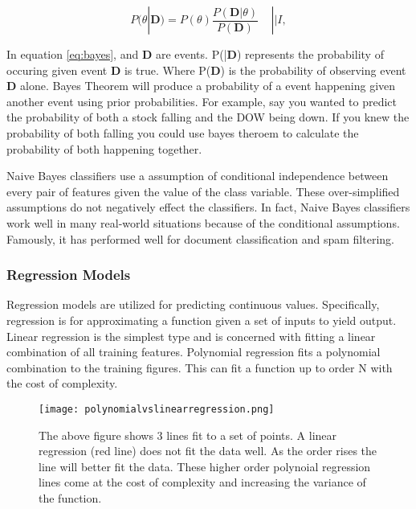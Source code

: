 \begin{equation}
    \label{eq:bayes}
    P(\theta|\textbf{D}) = P(\theta ) \frac{P(\textbf{D} |\theta)}{P(\textbf{D})} ~~~~~|| I,
\end{equation}

In equation \ref{eq:bayes}, \theta and \textbf{D} are events. 
P(\theta|\textbf{D}) represents the probability of \theta occuring given event \textbf{D} is true.
Where P(\textbf{D}) is the probability of observing event \textbf{D} alone.
Bayes Theorem will produce a probability of a event happening given another event using prior probabilities.
For example, say you wanted to predict the probability of both a stock falling and the DOW being down.
If you knew the probability of both falling you could use bayes theroem to calculate the probability of both happening together.

Naive Bayes classifiers use a assumption of conditional independence between every pair of features given the value of the class variable. 
These over-simplified assumptions do not negatively effect the classifiers.
In fact, Naive Bayes classifiers work well in many real-world situations because of the conditional assumptions\cite{zhang2004optimality}.
Famously, it has performed well for document classification and spam filtering. 

\subsubsection{Regression Models}
Regression models are utilized for predicting continuous values.
Specifically, regression is for approximating a function given a set of inputs to yield output.
Linear regression is the simplest type and is concerned with fitting a linear combination of all training features.
Polynomial regression fits a polynomial combination to the training figures.
This can fit a function up to order N with the cost of complexity.

\begin{figure}[h]
    \centering
    \texttt{[image: polynomialvslinearregression.png]}
    \caption{The above figure shows 3 lines fit to a set of points. A linear regression (red line) does not fit the data well.
    As the order rises the line will better fit the data.
    These higher order polynoial regression lines come at the cost of complexity and increasing the variance of the function.}
    \label{fig:repressionexample}
\end{figure}

